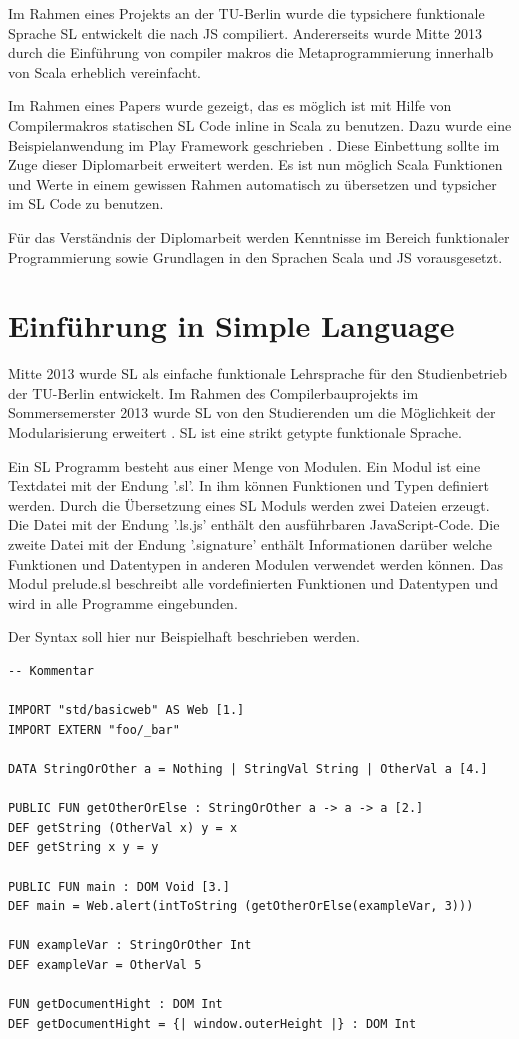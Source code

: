 \documentclass[12pt]{scrreprt}
\begin{document}
Im Rahmen eines Projekts \cite{Buchle2013} an der TU-Berlin wurde die typsichere funktionale Sprache \ac{SL} entwickelt die nach \ac{JS} compiliert. Andererseits wurde Mitte 2013 durch die Einführung von compiler makros \cite{Burmako2013} die Metaprogrammierung innerhalb von Scala erheblich vereinfacht.

Im Rahmen eines Papers \cite{Hoger2013} wurde gezeigt, das es möglich ist mit Hilfe von Compilermakros statischen \ac{SL} Code inline in Scala zu benutzen. Dazu wurde eine Beispielanwendung im Play Framework geschrieben \cite{Play1}. Diese Einbettung sollte im Zuge dieser Diplomarbeit erweitert werden. Es ist nun möglich Scala Funktionen und Werte in einem gewissen Rahmen automatisch zu übersetzen und typsicher im \ac{SL} Code zu benutzen.

Für das Verständnis der Diplomarbeit werden Kenntnisse im Bereich funktionaler Programmierung sowie Grundlagen in den Sprachen Scala und \ac{JS} vorausgesetzt.

\chapter{ Einführung in Simple Language}

Mitte 2013 wurde \ac{SL} als einfache funktionale Lehrsprache für den Studienbetrieb der TU-Berlin entwickelt. Im Rahmen des Compilerbauprojekts im Sommersemerster 2013 wurde \ac{SL} von den Studierenden um die Möglichkeit der Modularisierung erweitert \cite{Bisping2013}. \ac{SL} ist eine strikt getypte funktionale Sprache.

Ein \ac{SL} Programm besteht aus einer Menge von Modulen. Ein Modul ist eine Textdatei mit der Endung '.sl'. In ihm können Funktionen und Typen definiert werden. Durch die Übersetzung eines \ac{SL} Moduls werden zwei Dateien erzeugt. Die Datei mit der Endung '.ls.js' enthält den ausführbaren JavaScript-Code. Die zweite Datei mit der Endung '.signature' enthält Informationen darüber welche Funktionen und Datentypen in anderen Modulen verwendet werden können. Das Modul prelude.sl beschreibt alle vordefinierten Funktionen und Datentypen und wird in alle Programme eingebunden. 

Der Syntax soll hier nur Beispielhaft beschrieben werden.

\begin{lstlisting}[caption=Beispielmodul, label=lst:bsp1]
-- Kommentar

IMPORT "std/basicweb" AS Web [1.]
IMPORT EXTERN "foo/_bar"

DATA StringOrOther a = Nothing | StringVal String | OtherVal a [4.]

PUBLIC FUN getOtherOrElse : StringOrOther a -> a -> a [2.]
DEF getString (OtherVal x) y = x
DEF getString x y = y

PUBLIC FUN main : DOM Void [3.]
DEF main = Web.alert(intToString (getOtherOrElse(exampleVar, 3)))

FUN exampleVar : StringOrOther Int
DEF exampleVar = OtherVal 5

FUN getDocumentHight : DOM Int
DEF getDocumentHight = {| window.outerHeight |} : DOM Int

\end{lstlisting}
\end{document}
